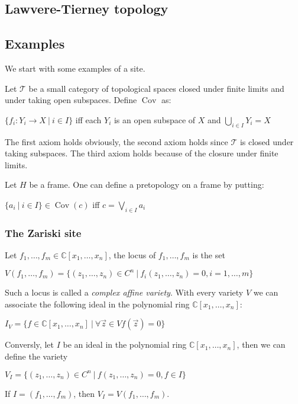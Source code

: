 \documentclass[a4paper]{article}
\theoremstyle{defin}
\theoremstyle{theorem}
\theoremstyle{claim}
\theoremstyle{prop}
\theoremstyle{lemma}
\theoremstyle{fact}
\theoremstyle{ex}
\theoremstyle{col}
\begin{document}
\subsection{Lawvere-Tierney topology}

\subsection{Examples}

We start with some examples of a site.

Let $\mathcal{T}$ be a small category of topological spaces closed under finite limits and under taking open subspaces. Define $\operatorname{Cov}$ as:
\begin{center}
$\{ f_i : Y_i \to X \: | \: i \in I \}$ iff each $Y_i$ is an open subspace of $X$ and $\bigcup \limits_{i \in I} Y_i = X$
\end{center}

The first axiom holds obviously, the second axiom holds since $\mathcal{T}$ is closed under taking subspaces. The third axiom holds because of the closure under finite limits.

Let $H$ be a frame. One can define a pretopology on a frame by putting:
\begin{center}
$\{ a_i \: | \: i \in I \} \in \operatorname{Cov}(c)$ iff $c = \bigvee \limits_{i \in I} a_i$
\end{center}

\subsubsection{The Zariski site}

Let $f_1, \dots, f_m \in \mathbb{C}[x_1, \dots, x_n]$, the locus of $f_1, \dots, f_m$ is the set
\begin{center}
$V(f_1, \dots, f_m) = \{ (z_1, \dots, z_n) \in C^n \: | \: f_i(z_1, \dots, z_n) = 0, i = 1, \dots, m \}$
\end{center}
Such a locus is called a \emph{complex affine variety}. With every variety $V$ we can associate the following ideal in the polynomial ring $\mathbb{C}[x_1, \dots, x_n]$:
\begin{center}
$I_V = \{ f \in \mathbb{C}[x_1, \dots, x_n] \: | \: \forall \vec{z} \in V f(\vec{z}) = 0 \}$
\end{center}
Conversly, let $I$ be an ideal in the polynomial ring $\mathbb{C}[x_1, \dots, x_n]$, then we can define the variety
\begin{center}
$V_I = \{ (z_1, \dots, z_n) \in C^n \: | \: f(z_1, \dots, z_n) = 0, f \in I \} $
\end{center}
If $I = (f_1, \dots, f_m)$, then $V_I = V(f_1, \dots, f_m)$.
\end{document}
